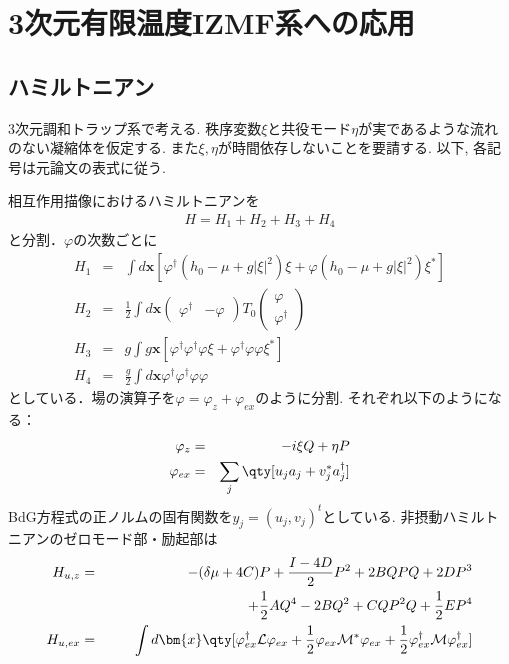\documentclass[10.5pt,a4paper]{jreport}
\begin{document}
\section{3次元有限温度IZMF系への応用}
\subsection{ハミルトニアン}
3次元調和トラップ系で考える. 秩序変数$\xi$と共役モード$\eta$が実であるような流れのない凝縮体を仮定する. また$\xi, \eta$が時間依存しないことを要請する. 以下, 各記号は元論文の表式に従う. 

相互作用描像におけるハミルトニアンを
\begin{eqnarray}
  H = H_1 + H_2 + H_3 + H_4
\end{eqnarray}
と分割．$\varphi$の次数ごとに
\begin{eqnarray}
  H_1 &=& \int d\bm{x} \left[ \varphi^\dagger(h_0 -\mu + g|\xi|^2)\xi + \varphi(h_0 - \mu + g|\xi|^2)\xi^* \right]\\
  H_2 &=& \frac{1}{2}\int d\bm{x}
  \begin{pmatrix}
    \varphi^\dagger & -\varphi
  \end{pmatrix}
  T_0
  \begin{pmatrix}
    \varphi\\
    \varphi^\dagger
  \end{pmatrix}
  \\
  H_3 &=& g\int g\bm{x} \left[ \varphi^\dagger\varphi^\dagger\varphi\xi + \varphi^\dagger\varphi\varphi\xi^* \right]\\
  H_4 &=& \frac{g}{2}\int d\bm{x} \varphi^\dagger\varphi^\dagger\varphi\varphi
\end{eqnarray}
としている．場の演算子を$\varphi = \varphi_{z} + \varphi_{ex}$のように分割. それぞれ以下のようになる：
\begin{eqnarray}
  \varphi_{z} &=& -i\xi Q + \eta P\label{Zeromode-expansion}\\
  \varphi_{ex} &=& \sum_j \qty[u_ja_j + v_j^*a_j^\dagger]\label{plane}
\end{eqnarray}
BdG方程式の正ノルムの固有関数を$y_j = (u_j, v_j)^t$としている. 非摂動ハミルトニアンのゼロモード部・励起部は
\begin{eqnarray}
  \nonumber H_{u, z} &=& -(\delta\mu +4C)P + \frac{I - 4D}{2}P^2 + 2BQPQ + 2DP^3\\
  &&\hspace{3.5cm} +\frac{1}{2}AQ^4- 2BQ^2 + CQP^2Q + \frac{1}{2}EP^4\\
  H_{u, ex} &=& \int d\bm{x} \qty[\varphi^\dagger_{ex}{\cal L}\varphi_{ex} + \frac{1}{2}\varphi_{ex}{\cal M}^*\varphi_{ex} + \frac{1}{2}\varphi^\dagger_{ex}{\cal M}\varphi^\dagger_{ex}]
\end{eqnarray}
\end{document}
